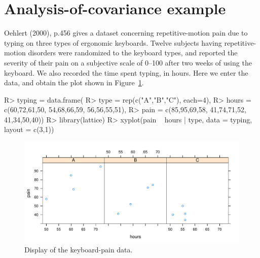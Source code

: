 \documentclass{article}
\begin{document}
\section{Analysis-of-covariance example}
Oehlert (2000), p.456 gives a dataset concerning repetitive-motion pain due to typing on three types of ergonomic keyboards. Twelve subjects having repetitive-motion disorders were randomized to the keyboard types, and reported the severity of their pain on a subjective scale of 0--100 after two weeks of using the keyboard. We also recorded the time spent typing, in hours. Here we enter the data, and obtain the plot shown in Figure~\ref{typing-fig}.
\begin{Winput}
R> typing = data.frame(
R>   type = rep(c("A","B","C"), each=4),
R>   hours = c(60,72,61,50, 54,68,66,59, 56,56,55,51),
R>   pain =  c(85,95,69,58, 41,74,71,52, 41,34,50,40))
R> library(lattice)
R> xyplot(pain ~ hours | type, data = typing, layout = c(3,1))
\end{Winput}
\begin{figure}
\includegraphics[scale=.75]{using-lsmeans-typing-scatter-fig.pdf}

\caption{Display of the keyboard-pain data.}\label{typing-fig}
\end{figure}
\end{document}
